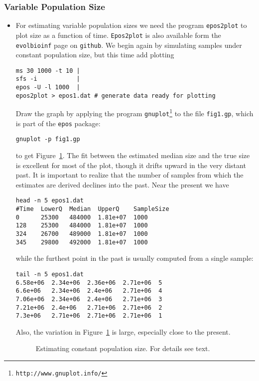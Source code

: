 \documentclass[a4paper]{article}
\newcommand{\ty}{\texttt}
\begin{document}
\subsubsection{Variable Population Size}
\begin{itemize}
  \item For estimating variable population sizes we need the program \ty{epos2plot} to
    plot size as a function of time. \ty{Epos2plot} is also available form the \ty{evolbioinf} page
    on \ty{github}. We begin again by simulating samples under constant population
    size, but this time add plotting
\begin{verbatim}
ms 30 1000 -t 10 | 
sfs -i           | 
epos -U -l 1000  | 
epos2plot > epos1.dat # generate data ready for plotting
\end{verbatim}
Draw the graph by applying the program
\ty{gnuplot}\footnote{\ty{http://www.gnuplot.info/}} to the file
\ty{fig1.gp}, which is part of the \ty{epos} package:
\begin{verbatim}
gnuplot -p fig1.gp
\end{verbatim}
to get Figure~\ref{fig:con}. The fit between the estimated median size
and the true size is excellent for most of the plot, though it drifts
upward in the very distant past. It is important to realize that the number of samples
from which the estimates are derived declines into the past. Near the
present we have
\begin{verbatim}
head -n 5 epos1.dat 
#Time  LowerQ  Median  UpperQ    SampleSize
0      25300   484000  1.81e+07  1000
128    25300   484000  1.81e+07	 1000
324    26700   489000  1.81e+07	 1000
345    29800   492000  1.81e+07	 1000
\end{verbatim}        
while the furthest point in the past is usually computed from a single
sample:
\begin{verbatim}
tail -n 5 epos1.dat 
6.58e+06  2.34e+06  2.36e+06  2.71e+06  5
6.6e+06   2.34e+06  2.4e+06   2.71e+06  4
7.06e+06  2.34e+06  2.4e+06   2.71e+06  3
7.21e+06  2.4e+06   2.71e+06  2.71e+06  2
7.3e+06   2.71e+06  2.71e+06  2.71e+06  1
\end{verbatim}
Also, the variation in Figure~\ref{fig:con} is
large, especially close to the present.
\begin{figure}
  \begin{center}
    \scalebox{0.6}{}
  \end{center}
  \caption{Estimating constant population size. For details see
  text.}\label{fig:con}
\end{figure}

\end{itemize}
\end{document}
